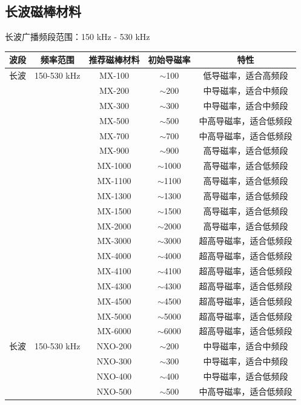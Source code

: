 \subsection{长波磁棒材料}
\label{sec:lw_magnetic_materials}

长波广播频段范围：150 kHz - 530 kHz

\begin{center}
\begin{tabular}{|c|c|c|c|c|}
\hline
\textbf{波段} & \textbf{频率范围} & \textbf{推荐磁棒材料} & \textbf{初始导磁率} & \textbf{特性} \\
\hline
长波 & 150-530 kHz & MX-100 & $\sim$100 & 低导磁率，适合高频段 \\
 & & MX-200 & $\sim$200 & 中导磁率，适合中频段 \\
 & & MX-300 & $\sim$300 & 中导磁率，适合中频段 \\
 & & MX-500 & $\sim$500 & 中高导磁率，适合低频段 \\
 & & MX-700 & $\sim$700 & 中高导磁率，适合低频段 \\
 & & MX-900 & $\sim$900 & 高导磁率，适合低频段 \\
 & & MX-1000 & $\sim$1000 & 高导磁率，适合低频段 \\
 & & MX-1100 & $\sim$1100 & 高导磁率，适合低频段 \\
 & & MX-1300 & $\sim$1300 & 高导磁率，适合低频段 \\
 & & MX-1500 & $\sim$1500 & 高导磁率，适合低频段 \\
 & & MX-2000 & $\sim$2000 & 高导磁率，适合低频段 \\
 & & MX-3000 & $\sim$3000 & 超高导磁率，适合低频段 \\
 & & MX-4000 & $\sim$4000 & 超高导磁率，适合低频段 \\
 & & MX-4100 & $\sim$4100 & 超高导磁率，适合低频段 \\
 & & MX-4300 & $\sim$4300 & 超高导磁率，适合低频段 \\
 & & MX-4500 & $\sim$4500 & 超高导磁率，适合低频段 \\
 & & MX-5000 & $\sim$5000 & 超高导磁率，适合低频段 \\
 & & MX-6000 & $\sim$6000 & 超高导磁率，适合低频段 \\
\hline
长波 & 150-530 kHz & NXO-200 & $\sim$200 & 中导磁率，适合中频段 \\
 & & NXO-300 & $\sim$300 & 中导磁率，适合中频段 \\
 & & NXO-400 & $\sim$400 & 中导磁率，适合低频段 \\
 & & NXO-500 & $\sim$500 & 中高导磁率，适合低频段 \\

\end{tabular}
\end{center}
